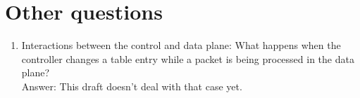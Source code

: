 \section{Other questions}
\begin{enumerate}
\item Interactions between the control and data plane: What happens when the controller changes a table entry while a packet is being processed in the data plane? \\
Answer: This draft doesn't deal with that case yet.
\end{enumerate}
